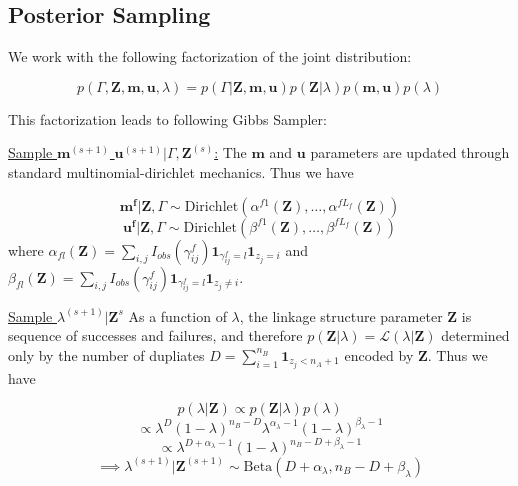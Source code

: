 \documentclass[
  12pt,
]{article}
\begin{document}
\hypertarget{posterior-sampling}{%
\subsection{Posterior Sampling}\label{posterior-sampling}}

We work with the following factorization of the joint distribution:

\[p(\Gamma, \mathbf{Z}, \mathbf{m}, \mathbf{u}, \lambda) = p(\Gamma|\mathbf{Z}, \mathbf{m}, \mathbf{u}) p(\mathbf{Z} | \lambda) p(\mathbf{m}, \mathbf{u}) p(\lambda)\]

This factorization leads to following Gibbs Sampler:

\underline{Sample $\mathbf{m}^{(s+1)}$ $\mathbf{u}^{(s+1)}|\Gamma, \mathbf{Z}^{(s)}$:}
The \(\mathbf{m}\) and \(\mathbf{u}\) parameters are updated through
standard multinomial-dirichlet mechanics. Thus we have

\[\mathbf{m^{f}}|\mathbf{Z}, \Gamma \sim \text{Dirichlet}(\alpha^{f1}(\mathbf{Z}), \ldots, \alpha^{fL_f}(\mathbf{Z}))\]
\[\mathbf{u^{f}}|\mathbf{Z}, \Gamma \sim \text{Dirichlet}(\beta^{f1}(\mathbf{Z}), \ldots, \beta^{fL_f}(\mathbf{Z}))\]
where
\(\alpha_{fl}(\mathbf{Z})= \sum_{i,j} I_{obs}(\gamma_{ij}^f)\mathbf{1}_{\gamma_{ij}^f = l} \mathbf{1}_{z_j = i}\)
and
\(\beta_{fl}(\mathbf{Z})= \sum_{i,j} I_{obs}(\gamma_{ij}^f)\mathbf{1}_{\gamma_{ij}^f = l} \mathbf{1}_{z_j \neq i}\).

\underline{Sample $\lambda^{(s+1)}|\mathbf{Z}^{s}$} As a function of
\(\lambda\), the linkage structure parameter \(\mathbf{Z}\) is sequence
of successes and failures, and therefore
\(p(\mathbf{Z}|\lambda) = \mathcal{L}(\lambda|\mathbf{Z})\) determined
only by the number of dupliates
\(D = \sum_{i=1}^{n_B}\mathbf{1}_{z_j < n_A + 1}\) encoded by
\(\mathbf{Z}\). Thus we have

\[p(\lambda | \mathbf{Z}) \propto p(\mathbf{Z}|\lambda)p(\lambda)\]
\[\propto \lambda^D (1-\lambda)^{n_B - D} \lambda^{\alpha_{\lambda} -1} (1-\lambda)^{\beta_{\lambda} -1}\]
\[ \propto \lambda^{D + \alpha_{\lambda} - 1} (1-\lambda)^{n_B - D + \beta_{\lambda} -1}\]
\[\implies \lambda^{(s+1)}|\mathbf{Z}^{(s+1)} \sim \text{Beta}(D + \alpha_{\lambda}, n_B - D + \beta_{\lambda})\]
\end{document}
